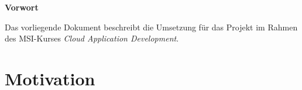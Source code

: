 \documentclass[paper,oneside,onecolumn,notitlepage,bibtotocnumbered,fontsize=12pt,bigheadings,ngerman]{scrartcl}
\newcommand{\sectionnumbering}[1]{%
  \setcounter{section}{0}%
   \renewcommand{\thesection}{\csname #1\endcsname{section}}}
\begin{document}




{\Large \textbf{Vorwort}}
\bigskip

Das vorliegende Dokument beschreibt die Umsetzung für das Projekt im Rahmen des MSI-Kurses \textit{Cloud Application Development}.




\normalsize


\setlength{\parindent}{0pt}

\newpage
\sectionnumbering{Roman} 
\tableofcontents
\clearpage

\listoffigures 
\clearpage 

\listoftables 
\clearpage
{} 
\sectionnumbering{arabic} 

\section{Motivation}
\end{document}
